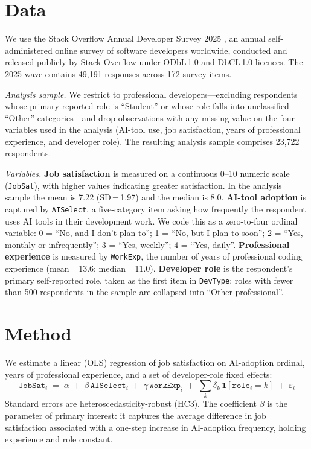 \documentclass[11pt]{article}
\begin{document}
\section{Data}

We use the Stack Overflow Annual Developer Survey 2025
\citep{stackoverflow2025survey}, an annual self-administered online
survey of software developers worldwide, conducted and released publicly
by Stack Overflow under ODbL\,1.0 and DbCL\,1.0 licences.
The 2025 wave contains 49,191 responses across 172 survey items.

\textit{Analysis sample.} We restrict to professional developers---excluding
respondents whose primary reported role is ``Student'' or whose role falls
into unclassified ``Other'' categories---and drop observations with any missing
value on the four variables used in the analysis (AI-tool use, job
satisfaction, years of professional experience, and developer role).
The resulting analysis sample comprises 23,722 respondents.

\textit{Variables.} \textbf{Job satisfaction} is measured on a continuous
0--10 numeric scale (\texttt{JobSat}), with higher values indicating greater
satisfaction. In the analysis sample the mean is 7.22 (SD\,=\,1.97) and the
median is 8.0. \textbf{AI-tool adoption} is captured by
\texttt{AISelect}, a five-category item asking how frequently the respondent
uses AI tools in their development work. We code this as a zero-to-four ordinal
variable: 0 = ``No, and I don't plan to''; 1 = ``No, but I plan to soon'';
2 = ``Yes, monthly or infrequently''; 3 = ``Yes, weekly''; 4 = ``Yes, daily''.
\textbf{Professional experience} is measured by \texttt{WorkExp}, the number
of years of professional coding experience (mean\,=\,13.6; median\,=\,11.0).
\textbf{Developer role} is the respondent's primary self-reported role,
taken as the first item in \texttt{DevType}; roles with fewer than 500
respondents in the sample are collapsed into ``Other professional''.

\section{Method}

We estimate a linear (OLS) regression of job satisfaction on AI-adoption
ordinal, years of professional experience, and a set of developer-role
fixed effects:
\[
  \texttt{JobSat}_i \;=\;
  \alpha
  \;+\; \beta\,\texttt{AISelect}_i
  \;+\; \gamma\,\texttt{WorkExp}_i
  \;+\; \sum_k \delta_k\,\mathbf{1}[\texttt{role}_i = k]
  \;+\; \varepsilon_i
\]
Standard errors are heteroscedasticity-robust (HC3). The coefficient
$\beta$ is the parameter of primary interest: it captures the average
difference in job satisfaction associated with a one-step increase in
AI-adoption frequency, holding experience and role constant.
\end{document}
